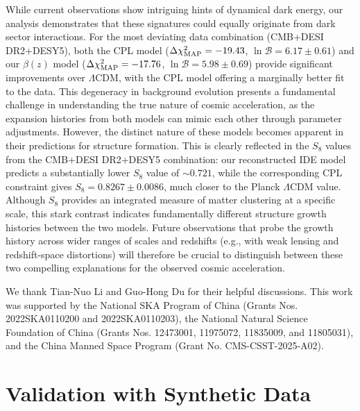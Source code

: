 \documentclass[a4paper,11pt]{article}
\begin{document}
While current observations show intriguing hints of dynamical dark energy, our analysis demonstrates that these signatures could equally originate from dark sector interactions. {For the most deviating data combination (CMB+DESI DR2+DESY5), both the CPL model ($\Delta\chi^2_{\rm MAP} = -19.43$, $\ln \mathcal{B} = 6.17 \pm 0.61$) and our $\beta(z)$ model ($\Delta\chi^2_{\rm MAP} = -17.76$, $\ln \mathcal{B} = 5.98 \pm 0.69$) provide significant improvements over $\Lambda$CDM, with the CPL model offering a marginally better fit to the data. This degeneracy in background evolution presents a fundamental challenge in understanding the true nature of cosmic acceleration, as the expansion histories from both models can mimic each other through parameter adjustments. However, the distinct nature of these models becomes apparent in their predictions for structure formation. This is clearly reflected in the $S_8$ values from the CMB+DESI DR2+DESY5 combination: our reconstructed IDE model predicts a substantially lower $S_8$ value of $\sim 0.721$, while the corresponding CPL constraint gives $S_8 = 0.8267 \pm 0.0086$, much closer to the Planck $\Lambda$CDM value. Although $S_8$ provides an integrated measure of matter clustering at a specific scale, this stark contrast indicates fundamentally different structure growth histories between the two models. Future observations that probe the growth history across wider ranges of scales and redshifts (e.g., with weak lensing and redshift-space distortions) will therefore be crucial to distinguish between these two compelling explanations for the observed cosmic acceleration.}

\begin{acknowledgments}
  We thank Tian-Nuo Li and Guo-Hong Du for their helpful discussions. This work was supported by the National SKA Program of China (Grants Nos. 2022SKA0110200 and 2022SKA0110203), the National Natural Science Foundation of China (Grants Nos. 12473001, 11975072, 11835009, and 11805031), and the China Manned Space Program (Grant No. CMS-CSST-2025-A02).
\end{acknowledgments}

\appendix
\section{Validation with Synthetic Data} \label{app:validation}
\end{document}
